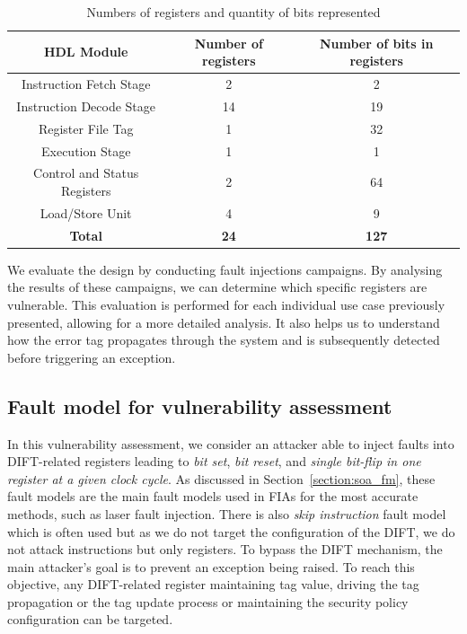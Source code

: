 \begin{table}[t]
    \centering
    \footnotesize
    \caption{Numbers of registers and quantity of bits represented}
    \label{tab:registersDIFT}
    \begin{tabular}{@{}ccc@{}}
        \toprule
        \textbf{HDL Module} & \textbf{Number of registers} & \textbf{Number of bits in registers} \\ \midrule
        Instruction Fetch Stage & 2 & 2 \\
        Instruction Decode Stage & 14 & 19 \\
        Register File Tag & 1 & 32 \\
        Execution Stage & 1 & 1 \\
        Control and Status Registers & 2 & 64 \\
        Load/Store Unit & 4 & 9 \\
        \midrule
        \midrule
        \textbf{Total} & \textbf{\textbf{24}} & \textbf{\textbf{127}} \\
        \bottomrule
    \end{tabular}
\end{table}

We evaluate the design by conducting fault injections campaigns. By analysing the results of these campaigns, we can determine which specific registers are vulnerable. This evaluation is performed for each individual use case previously presented, allowing for a more detailed analysis. It also helps us to understand how the error tag propagates through the system and is subsequently detected before triggering an exception.

\subsection{Fault model for vulnerability assessment}
In this vulnerability assessment, we consider an attacker able to inject faults into DIFT-related registers leading to \textit{bit set}, \textit{bit reset}, and \textit{single bit-flip in one register at a given clock cycle}. 
As discussed in Section~\ref{section:soa_fm}, these fault models are the main fault models used in FIAs for the most accurate methods, such as laser fault injection. There is also \textit{skip instruction} fault model which is often used but as we do not target the configuration of the DIFT, we do not attack instructions but only registers.
To bypass the DIFT mechanism, the main attacker's goal is to prevent an exception being raised. To reach this objective, any DIFT-related register maintaining tag value, driving the tag propagation or the tag update process or maintaining the security policy configuration can be targeted.


